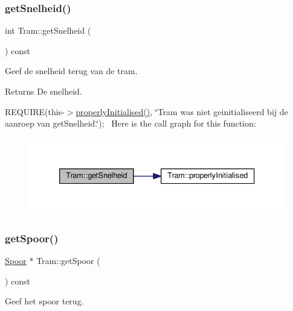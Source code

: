 \subsubsection{\texorpdfstring{get\+Snelheid()}{getSnelheid()}}
{\footnotesize\ttfamily int Tram\+::get\+Snelheid (\begin{DoxyParamCaption}{ }\end{DoxyParamCaption}) const}



Geef de snelheid terug van de tram. 

\begin{DoxyReturn}{Returns}
De snelheid.
\end{DoxyReturn}
R\+E\+Q\+U\+I\+RE(this-\/$>$\hyperlink{class_tram_ac2688f590e4db232b4f535c9bf959efb}{properly\+Initialised()}, \char`\"{}\+Tram was niet geinitialiseerd bij de aanroep van get\+Snelheid.\char`\"{});~\newline
Here is the call graph for this function\+:\nopagebreak
\begin{figure}[H]
\begin{center}
\leavevmode
\includegraphics[width=333pt]{class_tram_aa8bcd980469801cb8524f170006f666c_cgraph}
\end{center}
\end{figure}
\mbox{\label{class_tram_aee9cf13e0525ac7c769709edf1ff987d}} 
\subsubsection{\texorpdfstring{get\+Spoor()}{getSpoor()}}
{\footnotesize\ttfamily \hyperlink{class_spoor}{Spoor} $\ast$ Tram\+::get\+Spoor (\begin{DoxyParamCaption}{ }\end{DoxyParamCaption}) const}



Geef het spoor terug. 

